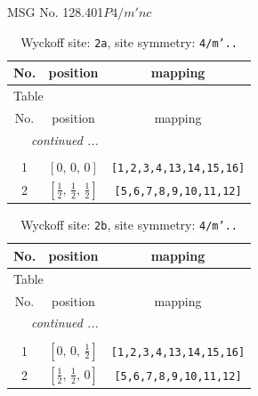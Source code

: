 \documentclass[fleqn,8pt]{jsarticle}
\begin{document}
\setcounter{MaxMatrixCols}{32}

\renewcommand{\tablename}{Table~}
\renewcommand{\figurename}{Figure~}
\begin{center}
\LARGE
MSG No. 128.401\quad$P4/m'nc$
\end{center}
\renewcommand{\arraystretch}{1.2}
\begin{longtable}{ccc}
\caption{Wyckoff site: {\tt 2a}, site symmetry: {\tt 4/m'..}}
 \\
 \hline \hline
No. & position & mapping \\ \hline \endfirsthead

\multicolumn{2}{l}{\tablename\ \thetable{}} \\
 \hline \hline
No. & position & mapping \\ \hline \endhead

 \hline \hline
\multicolumn{2}{r}{\footnotesize\it continued ...} \\ \endfoot

 \hline \hline
\multicolumn{2}{r}{} \\ \endlastfoot

1 & $\left[ 0,\, 0,\, 0 \right]$ & {\tt [1,2,3,4,13,14,15,16]} \\ \hline
2 & $\left[ \frac{1}{2},\, \frac{1}{2},\, \frac{1}{2} \right]$ & {\tt [5,6,7,8,9,10,11,12]} \\
\end{longtable}
\renewcommand{\arraystretch}{1.2}
\begin{longtable}{ccc}
\caption{Wyckoff site: {\tt 2b}, site symmetry: {\tt 4/m'..}}
 \\
 \hline \hline
No. & position & mapping \\ \hline \endfirsthead

\multicolumn{2}{l}{\tablename\ \thetable{}} \\
 \hline \hline
No. & position & mapping \\ \hline \endhead

 \hline \hline
\multicolumn{2}{r}{\footnotesize\it continued ...} \\ \endfoot

 \hline \hline
\multicolumn{2}{r}{} \\ \endlastfoot

1 & $\left[ 0,\, 0,\, \frac{1}{2} \right]$ & {\tt [1,2,3,4,13,14,15,16]} \\ \hline
2 & $\left[ \frac{1}{2},\, \frac{1}{2},\, 0 \right]$ & {\tt [5,6,7,8,9,10,11,12]} \\
\end{longtable}
\end{document}
